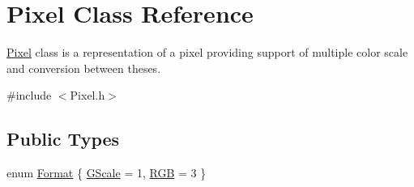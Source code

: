 \hypertarget{class_pixel}{}\section{Pixel Class Reference}
\label{class_pixel}


\mbox{\hyperlink{class_pixel}{Pixel}} class is a representation of a pixel providing support of multiple color scale and conversion between theses.  




{\ttfamily \#include $<$Pixel.\+h$>$}

\subsection*{Public Types}
\begin{DoxyCompactItemize}
\item 
enum \mbox{\hyperlink{class_pixel_aa1531d5d16ab3ab809a8e071145f0a50}{Format}} \{ \mbox{\hyperlink{class_pixel_aa1531d5d16ab3ab809a8e071145f0a50a0067e32761943fc277951f656686ce1a}{G\+Scale}} = 1, 
\mbox{\hyperlink{class_pixel_aa1531d5d16ab3ab809a8e071145f0a50aff2c7eeaaaaf24a83e97388116481444}{R\+GB}} = 3
 \}
\end{DoxyCompactItemize}
